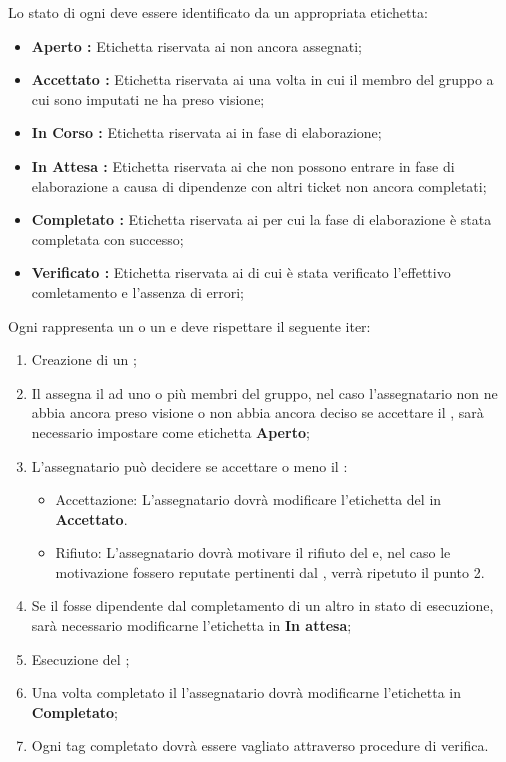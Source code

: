 \documentclass[12pt,a4paper]{article}
\begin{document}
Lo stato di ogni \textit{} deve essere identificato da un appropriata etichetta:
\begin{itemize}
  \item \textbf{Aperto : } Etichetta riservata ai \textit{} non ancora assegnati;
  \item \textbf{Accettato : } Etichetta riservata ai \textit{} una volta in cui il membro del gruppo a cui sono imputati ne ha preso visione;
  \item \textbf{In Corso : } Etichetta riservata ai \textit{} in fase di elaborazione;
  \item \textbf{In Attesa : } Etichetta riservata ai \textit{} che non possono entrare in fase di elaborazione a causa di dipendenze con altri ticket non ancora completati;
  \item \textbf{Completato : } Etichetta riservata ai \textit{} per cui la fase di elaborazione è stata completata con successo;
  \item \textbf{Verificato : } Etichetta riservata ai \textit{} di cui è stata verificato l'effettivo comletamento e l'assenza di errori;
\end{itemize}

Ogni \textit{} rappresenta un  o un \textit{} e deve rispettare il seguente iter:

\begin{enumerate}
  \item Creazione di un \textit{};
  \item Il \PM{} assegna il \textit{} ad uno o più membri del gruppo, nel caso l'assegnatario non ne abbia ancora preso visione o non abbia ancora deciso se accettare il \textit{}, sarà necessario impostare come etichetta \textbf{Aperto};  
    \item L'assegnatario può decidere se accettare o meno il \textit{}:
    	\begin{itemize}
    	\item Accettazione: L'assegnatario dovrà modificare l'etichetta del \textit{} in \textbf{Accettato}.
    	\item Rifiuto: L'assegnatario dovrà motivare il rifiuto del \textit{} e, nel caso le motivazione fossero reputate pertinenti dal \PM{}, verrà ripetuto il punto 2. 
    	\end{itemize}
	\item Se il \textit{} fosse dipendente dal completamento di un altro \textit{} in stato di esecuzione, sarà necessario modificarne l'etichetta in \textbf{In attesa};
	\item Esecuzione del \textit{};
	\item Una volta completato il \textit{} l'assegnatario dovrà modificarne l'etichetta in \textbf{Completato};
	\item Ogni tag completato dovrà essere vagliato attraverso procedure di verifica. 
\end{enumerate}
\end{document}
